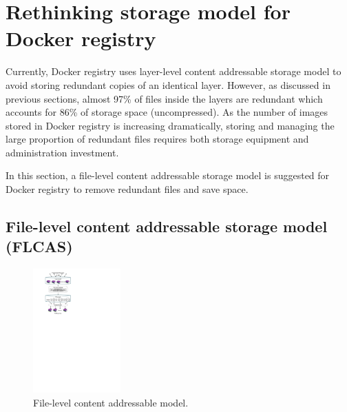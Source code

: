 \section{Rethinking storage model for Docker registry}
\label{sec:file_adressable}

Currently, Docker registry uses layer-level content addressable storage model to avoid storing redundant copies of an identical layer. 
However, as discussed in previous sections, almost 97\% of files inside the layers are redundant which accounts for 86\% of storage space (uncompressed). 
As the number of images stored in Docker registry is increasing dramatically, 
storing and managing the large proportion of redundant files requires both storage equipment and administration investment. 

In this section, a file-level content addressable storage model is suggested for Docker registry to remove redundant files and save space.   

\subsection{File-level content addressable storage model (FLCAS)}
\label{subsec:FLCAS}

\begin{figure}
	\centering
	\includegraphics[width=0.3\textwidth]{graphs/graph_compression_layers.pdf}
	\caption{File-level content addressable model.
	}
	\label{fig:file-dedup-model}
\end{figure}

